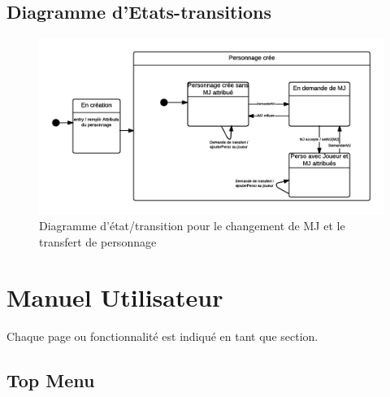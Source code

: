 \documentclass[a4paper,oneside,10pt]{article}
\begin{document}
\subsection{Diagramme d'Etats-transitions}
\begin{figure}[H]
	\begin{center}
		\includegraphics[width=\textwidth]{images/sequence/ET-Personnage.png}  
		\caption{Diagramme d'état/transition pour le changement de MJ et le transfert de personnage}
	\end{center}
\end{figure}

\pagebreak

\section{Manuel Utilisateur}

Chaque page ou fonctionnalité est indiqué en tant que section. 

\subsection{Top Menu}
\label{MUTopMenu}
\end{document}
